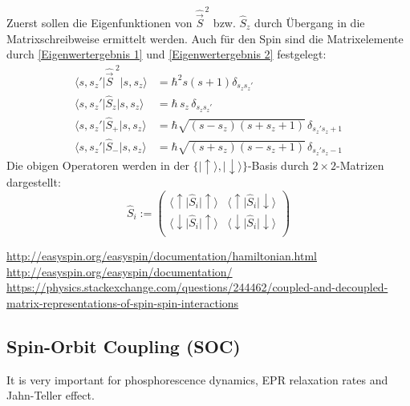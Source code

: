 \documentclass[9pt]{report}
\begin{document}
Zuerst sollen die Eigenfunktionen von $\hat{\vec{S}}^{\,2}$ bzw. $\hat{S}_{z}$ durch Übergang in die Matrixschreibweise ermittelt werden. Auch für den Spin sind die Matrixelemente durch \eqref{Eigenwertergebnis 1} und \eqref{Eigenwertergebnis 2} festgelegt:
\begin{align}
\big\langle s,s_{z}'\big|\hat{\vec{S}}^{\;2}\big|s,s_{z}\big\rangle &= \hbar^{2}s(s+1)\delta_{s_{z}s_{z}'}
\\
\big\langle s,s_{z}'\big|\hat{S}_{z}\big|s,s_{z}\big\rangle &= \hbar \,s_{z}\,\delta_{s_{z}s_{z}'}
\\
\big\langle s,s_{z}'\big|\hat{S}_{+}\big|s,s_{z}\big\rangle &= \hbar\sqrt{(s-s_{z})(s+s_{z}+1)}\,\delta_{s_{z}'s_{z}+1}
\\
\big\langle s,s_{z}'\big|\hat{S}_{-}\big|s,s_{z}\big\rangle &= \hbar\sqrt{(s+s_{z})(s-s_{z}+1)}\,\delta_{s_{z}'s_{z}-1}
\end{align}
Die obigen Operatoren werden in der $\{\big|\uparrow\big\rangle,\big|\downarrow\big\rangle\}$-Basis durch $2\times 2$-Matrizen dargestellt:
\begin{equation}
\renewcommand{\arraystretch}{1.4}
\hat{S}_{i}:=
\left(\begin{array}{cc}
\big\langle \uparrow\big|\hat{S}_i\big|\uparrow\big\rangle
&
\big\langle \uparrow\big|\hat{S}_i\big|\downarrow\big\rangle
\\
\big\langle \downarrow\big|\hat{S}_i\big|\uparrow\big\rangle
& 
\big\langle \downarrow\big|\hat{S}_i\big|\downarrow\big\rangle
\\\end{array}\right)
\end{equation}


\url{http://easyspin.org/easyspin/documentation/hamiltonian.html}\\
\url{http://easyspin.org/easyspin/documentation/}\\
\url{https://physics.stackexchange.com/questions/244462/coupled-and-decoupled-matrix-representations-of-spin-spin-interactions}








\subsection{Spin-Orbit Coupling (SOC)}
It is very important for phosphorescence dynamics, EPR relaxation rates and Jahn-Teller effect.
\end{document}
